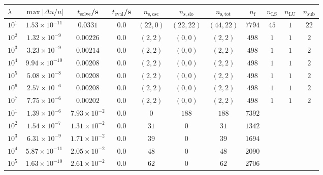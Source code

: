 \begin{tabular}{l c c c c c c c c c c}
\hline \hline 
$\lambda$  &  $\max|\Delta u/u|$  &  $t_{\mathrm{solve}}$/\si{\s}  &
$t_{\mathrm{eval}}$/\si{\s}  &  $n_{\mathrm{s,osc}}$  &  $n_{\mathrm{s,slo}}$
&  $n_{\mathrm{s,tot}}$  &  $n_{\mathrm{f}}$  &  $n_{\mathrm{LS}}$  &
$n_{\mathrm{LU}}$  &  $n_{\mathrm{sub}}$ \\ \hline
$10^1$  &  $1.53 \times 10^{-11}$  &  $0.0331$  &  $0.0$  &  $(22, 0)$  &  $(22, 22)$  &  $(44, 22)$  &  $7794$  &  $45$  &  $1$  &  $22$\\ 
$10^2$  &  $1.32 \times 10^{-9}$  &  $0.00226$  &  $0.0$  &  $(2, 2)$  &  $(0, 0)$  &  $(2, 2)$  &  $498$  &  $1$  &  $1$  &  $2$\\ 
$10^3$  &  $3.23 \times 10^{-9}$  &  $0.00214$  &  $0.0$  &  $(2, 2)$  &  $(0, 0)$  &  $(2, 2)$  &  $498$  &  $1$  &  $1$  &  $2$\\ 
$10^4$  &  $9.94 \times 10^{-10}$  &  $0.00208$  &  $0.0$  &  $(2, 2)$  &  $(0, 0)$  &  $(2, 2)$  &  $498$  &  $1$  &  $1$  &  $2$\\ 
$10^5$  &  $5.08 \times 10^{-8}$  &  $0.00208$  &  $0.0$  &  $(2, 2)$  &  $(0, 0)$  &  $(2, 2)$  &  $498$  &  $1$  &  $1$  &  $2$\\ 
$10^6$  &  $2.57 \times 10^{-6}$  &  $0.00208$  &  $0.0$  &  $(2, 2)$  &  $(0, 0)$  &  $(2, 2)$  &  $498$  &  $1$  &  $1$  &  $2$\\ 
$10^7$  &  $7.75 \times 10^{-6}$  &  $0.00202$  &  $0.0$  &  $(2, 2)$  &  $(0, 0)$  &  $(2, 2)$  &  $498$  &  $1$  &  $1$  &  $2$\\ 
\hline \hline
$10^1$  &  $1.39 \times 10^{-6}$  &  $7.93 \times 10^{-2}$  &  $0.0$  &  $0$  &  $188$  &  $188$  &  $7392$ & & & \\ 
$10^2$  &  $1.54 \times 10^{-7}$  &  $1.31 \times 10^{-2}$  &  $0.0$  &  $31$  &  $0$  &  $31$  &  $1342$  & & & \\ 
$10^3$  &  $6.31 \times 10^{-9}$  &  $1.71 \times 10^{-2}$  &  $0.0$  &  $39$  &  $0$  &  $39$  &  $1694$  & & & \\ 
$10^4$  &  $5.87 \times 10^{-11}$  &  $2.05 \times 10^{-2}$  &  $0.0$  &  $48$  &  $0$  &  $48$  &  $2090$  & & & \\ 
$10^5$  &  $1.63 \times 10^{-10}$  &  $2.61 \times 10^{-2}$  &  $0.0$  &  $62$  &  $0$  &  $62$  &  $2706$  & & & \\ 

\end{tabular}
